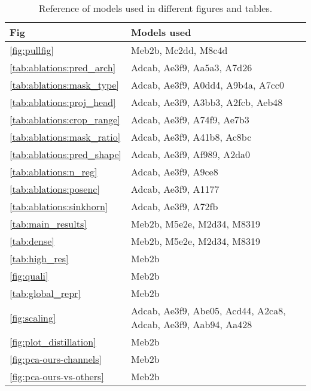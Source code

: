 \begin{table}
\caption{Reference of models used in different figures and tables.}
\label{tab:fig_to_model}
\begin{tabular}{ll}
\toprule
Fig & Models used \\
\midrule
\cref{fig:pullfig} & Meb2b, Mc2dd, M8c4d \\
\cref{tab:ablations:pred_arch} & Adcab, Ae3f9, Aa5a3, A7d26 \\
\cref{tab:ablations:mask_type} & Adcab, Ae3f9, A0dd4, A9b4a, A7cc0 \\
\cref{tab:ablations:proj_head} & Adcab, Ae3f9, A3bb3, A2fcb, Aeb48 \\
\cref{tab:ablations:crop_range} & Adcab, Ae3f9, A74f9, Ae7b3 \\
\cref{tab:ablations:mask_ratio} & Adcab, Ae3f9, A41b8, Ac8bc \\
\cref{tab:ablations:pred_shape} & Adcab, Ae3f9, Af989, A2da0 \\
\cref{tab:ablations:n_reg} & Adcab, Ae3f9, A9ce8 \\
\cref{tab:ablations:posenc} & Adcab, Ae3f9, A1177 \\
\cref{tab:ablations:sinkhorn} & Adcab, Ae3f9, A72fb \\
\cref{tab:main_results} & Meb2b, M5e2e, M2d34, M8319 \\
\cref{tab:dense} & Meb2b, M5e2e, M2d34, M8319 \\
\cref{tab:high_res} & Meb2b \\
\cref{fig:quali} & Meb2b \\
\cref{tab:global_repr} & Meb2b \\
\cref{fig:scaling} & Adcab, Ae3f9, Abe05, Acd44, A2ca8, Adcab, Ae3f9, Aab94, Aa428 \\
\cref{fig:plot_distillation} & Meb2b \\
\cref{fig:pca-ours-channels} & Meb2b \\
\cref{fig:pca-ours-vs-others} & Meb2b \\
\bottomrule
\end{tabular}
\end{table}
